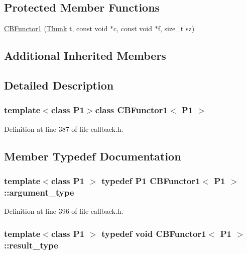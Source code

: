 \subsection*{Protected Member Functions}
\begin{DoxyCompactItemize}
\item 
\hyperlink{class_c_b_functor1_a68b9dfdd164abbcaabd03a70e0a2699e}{C\+B\+Functor1} (\hyperlink{class_c_b_functor1_a447200fb312ec0cf184fd5c96da59c5a}{Thunk} t, const void $\ast$c, const void $\ast$f, size\+\_\+t sz)
\end{DoxyCompactItemize}
\subsection*{Additional Inherited Members}


\subsection{Detailed Description}
\subsubsection*{template$<$class P1$>$class C\+B\+Functor1$<$ P1 $>$}



Definition at line 387 of file callback.\+h.



\subsection{Member Typedef Documentation}
\hypertarget{class_c_b_functor1_ad53b976c17b95b8170f3597725821386}{
\subsubsection[{argument\+\_\+type}]{\setlength{\rightskip}{0pt plus 5cm}template$<$class P1 $>$ typedef P1 {\bf C\+B\+Functor1}$<$ P1 $>$\+::{\bf argument\+\_\+type}}}\label{class_c_b_functor1_ad53b976c17b95b8170f3597725821386}


Definition at line 396 of file callback.\+h.

\hypertarget{class_c_b_functor1_a6803f5dfe59d2edeb3988b09b7d73b6e}{
\subsubsection[{result\+\_\+type}]{\setlength{\rightskip}{0pt plus 5cm}template$<$class P1 $>$ typedef void {\bf C\+B\+Functor1}$<$ P1 $>$\+::{\bf result\+\_\+type}}}\label{class_c_b_functor1_a6803f5dfe59d2edeb3988b09b7d73b6e}


